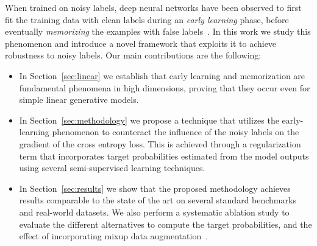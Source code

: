 \documentclass{article}
\newcommand{\1}{\mathds{1}}
\begin{document}
 When trained on noisy labels, deep neural networks have been observed to first fit the training data with clean labels during an \emph{early learning} phase, before eventually \emph{memorizing} the examples with false labels~\citep{arpit2017closer,zhang2016understanding}. In this work we study this phenomenon and introduce a novel framework that exploits it to achieve robustness to noisy labels. Our main contributions are the following:
 
\begin{itemize}[leftmargin=*]
\item In Section~\ref{sec:linear} we establish that early learning and memorization are fundamental phenomena in high dimensions, proving that they occur even for simple linear generative models.
\item In Section~\ref{sec:methodology} we propose a technique that utilizes the early-learning phenomenon to counteract the influence of the noisy labels on the gradient of the cross entropy loss. This is achieved through a regularization term that incorporates target probabilities estimated from the model outputs using several semi-supervised learning techniques.
\item In Section~\ref{sec:results} we show that the proposed methodology achieves results comparable to the state of the art on several standard benchmarks and real-world datasets. We also perform a systematic ablation study to evaluate the different alternatives to compute the target probabilities, and the effect of incorporating mixup data augmentation~\citep{zhang2017mixup}.
\end{itemize}
\end{document}
